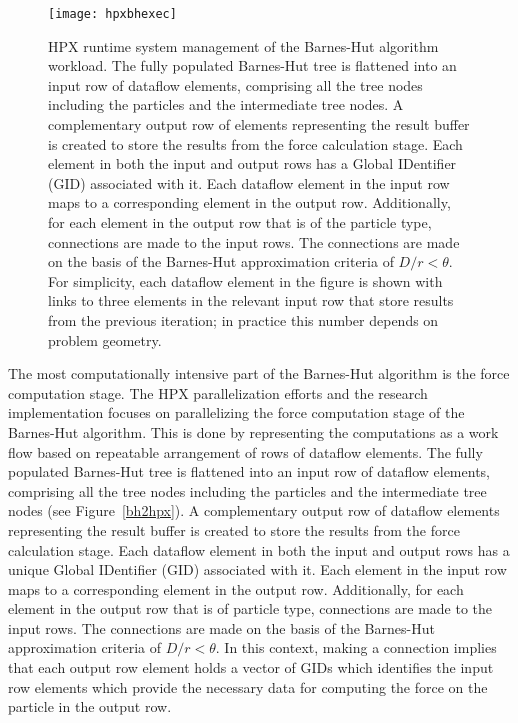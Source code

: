 \documentclass[floatfix]{revtex4}
\begin{document}
\begin{figure}[htp]
\centering
\texttt{[image: hpxbhexec]}
\caption{HPX runtime system management of the Barnes-Hut algorithm workload.
The fully populated Barnes-Hut tree is flattened into an input row of 
dataflow elements, comprising all the tree nodes including the particles and the
intermediate tree nodes. A complementary output row of elements representing the result buffer is created to store
the results from the force calculation stage. Each element in both the input and output rows has a Global IDentifier (GID) associated
with it. Each dataflow element in the input row maps to a corresponding
element in the output row. Additionally, for each element in the output 
row that is of the particle type, connections are made to the input rows.
The connections are made on the basis of the Barnes-Hut approximation criteria of $D/r < \theta$.
For simplicity, each dataflow element in the figure is shown with links to 
three elements in the relevant input row that store results from the previous 
iteration; in practice this number depends on problem geometry.}
\label{fig:hpxbhexec}
\end{figure}

The most computationally intensive part of the Barnes-Hut algorithm is the force computation stage. 
The HPX parallelization
efforts and the research implementation focuses on parallelizing the force 
computation stage of the Barnes-Hut algorithm.
This is done by representing the computations as a work flow based on 
repeatable arrangement of rows of dataflow elements. The fully populated
Barnes-Hut tree is flattened into an input row of dataflow elements, 
comprising all the tree nodes including the particles and the
intermediate tree nodes (see Figure~\ref{bh2hpx}). 
A complementary output row of dataflow elements representing the result buffer is 
created to store the results from the force calculation stage. 
Each dataflow element in both the input and output rows 
has a unique Global IDentifier (GID) associated
with it. Each element in the input row maps to a corresponding element in 
the output row. 
Additionally, for each element in the output row
that is of particle type, connections are made to the input rows.
The connections are made on the basis of the Barnes-Hut approximation criteria of $D/r < \theta$. In this context, making a
connection implies that each output row element holds a vector of GIDs 
which identifies the input row elements which provide
the necessary data for computing the force on the particle in the output row.
\end{document}
